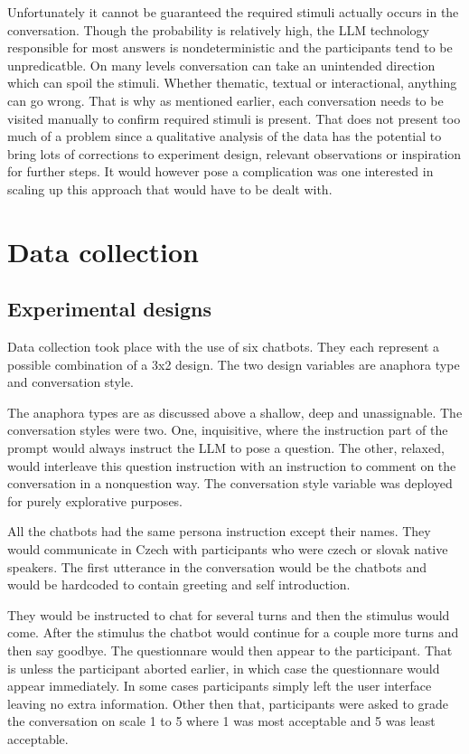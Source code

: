 \documentclass[12pt]{report}
\begin{document}
{Unfortunately it cannot be guaranteed
the required stimuli actually occurs in the conversation.
Though the probability is relatively high,
the LLM technology responsible for most answers
is nondeterministic
and the participants tend to be unpredicatble.
On many levels conversation can take an unintended direction
which can spoil the stimuli.
Whether thematic, textual or interactional,
anything can go wrong.
That is why as mentioned earlier,
each conversation needs to be visited manually
to confirm required stimuli is present.
That does not present too much of a problem
since a qualitative analysis of the data
has the potential to bring lots of
corrections to experiment design,
relevant observations or
inspiration for further steps.
It would however pose a complication
was one interested in scaling up this approach
that would have to be dealt with.

\section{Data collection}

\subsection{Experimental designs}

Data collection took place with the use of six chatbots.
They each represent a possible combination of a 3x2 design.
The two design variables are anaphora type and conversation style.

The anaphora types are as discussed above a shallow, deep and unassignable.
The conversation styles were two. One, inquisitive,
where the instruction part of the prompt
would always instruct the LLM to pose a question.
The other, relaxed, would interleave this question instruction with
an instruction to comment on the conversation in a nonquestion way.
The conversation style variable was deployed for purely explorative purposes.

All the chatbots had the same persona instruction except their names.
They would communicate in Czech with participants who were czech or slovak native speakers.
The first utterance in the conversation would be the chatbots and
would be hardcoded to contain greeting and self introduction.

They would be instructed to chat for several turns and then the stimulus would come.
After the stimulus the chatbot would continue for a couple more turns and then say goodbye.
The questionnare would then appear to the participant.
That is unless the participant aborted earlier, in which case the questionnare would appear immediately.
In some cases participants simply left the user interface leaving no extra information.
Other then that, participants were asked to grade the conversation on scale 1 to 5
where 1 was most acceptable and 5 was least acceptable.

}
\end{document}
